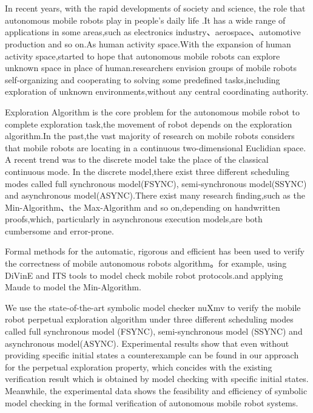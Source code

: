 \newpage
\vspace{-1cm}
\chapter*{}
\vspace{-0.5cm}
In recent years, with the rapid developments of society and science, the role that autonomous mobile robots play in people's daily life .It has a wide range of applications in some areas,such as electronics industry、aerospace、automotive production and so on.As human activity space.With the expansion of human activity space,started to hope that autonomous mobile robots can explore unknown space in place of human.researchers envision groups of mobile robots self-organizing and cooperating to solving some predefined tasks,including exploration of unknown environments,without any central coordinating authority.

Exploration Algorithm is the core problem for the autonomous mobile robot to complete exploration task,the movement of robot depends on the exploration algorithm.In the past,the vast majority of research on mobile robots considers that mobile robots are locating in a continuous two-dimensional Euclidian space. A recent trend was to the discrete model take the place of the classical continuous mode. In the discrete model,there exist three different scheduling modes called full synchronous model(FSYNC), semi-synchronous model(SSYNC) and asynchronous model(ASYNC).There exist many research finding,such as the  Min-Algorithm、the Max-Algorithm and so on,depending on handwritten proofs,which, particularly in asynchronous execution models,are both cumbersome and error-prone.

Formal methods for the automatic, rigorous and efficient has been used to verify the correctness of mobile autonomous robots algorithm。for example, using DiVinE and ITS tools to model check mobile robot protocols.and applying Maude to model the Min-Algorithm.

We use the state-of-the-art symbolic model checker nuXmv to verify the mobile robot perpetual exploration algorithm under three different scheduling modes called full synchronous model (FSYNC), semi-synchronous model (SSYNC) and asynchronous model(ASYNC). Experimental results show that even without providing specific initial states a counterexample can be found in our approach for the perpetual exploration property, which concides with the existing verification result which is obtained by model checking with specific initial states. Meanwhile, the experimental data shows the feasibility and efficiency of symbolic model checking in the formal verification of autonomous mobile robot systems.

